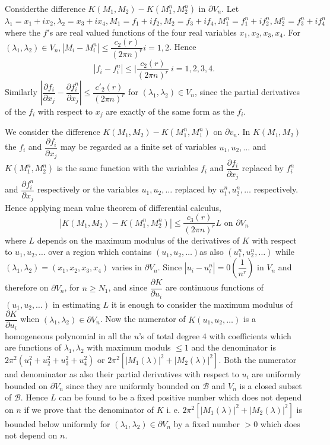 Consider\pageoriginale the difference $K (M_1,  M_2) - K (M^n_1,  M^n_2)$ in
$\partial V_n$. Let $\lambda_1 = x_1 + ix_2,  \lambda_2 = x_3 + ix_4,
M_1 = f_1 + if_2,  M_2 = f_3 + if_4, M^n_1 = f^n_1 + if^n_2, M^n_2 =
f^n_3 + if^n_4$ where the $f'$s are real valued functions of the four
real variables $x_1,  x_2,  x_3,  x_4$. For $(\lambda_1,  \lambda_2)
\in V_n,  | M_i - M^n_i | \leq \dfrac{c_2 (r)}{(2 \pi n)^r} i = 1,
2$. Hence 
$$
|f_i - f^n_i | \leq | \frac{c_2 (r)}{(2 \pi n)^r} ~i = 1, 2, 3, 4.
$$
Similarly $| \dfrac{\partial f_i} {\partial x_j} -   \dfrac{\partial
  f^n_i} {\partial x_j}| \leq \dfrac{c'_2 (r)}{(2 \pi n)^r}$ for
$(\lambda_1,  \lambda_2) \in V_n$, since the partial derivatives of
the $f_i$ with respect to $x_j$ are exactly of the same form as the
$f_i$. 

We consider the difference $K(M_1,  M_2) - K(M^n_1, M^n_1)$ on
$\partial v_n$. In $K(M_1,  M_2)$ the $f_i$ and $\dfrac{\partial
  f_i}{\partial x_j}$ may be regarded as a finite set of variables
$u_1, u_2, \ldots $ and $K(M^n_1, M^n_2)$ is the same function with
the variables $f_i$ and $\dfrac{\partial f_i}{\partial x_j}$ replaced
by $f^n_i$ and $\dfrac{\partial f^n_i}{\partial x_j}$ respectively or
the variables $u_1,  u_2, \ldots$ replaced by $u^n_1,  u^n_2, \ldots$
respectively. Hence applying mean value theorem of differential
calculus, 
\begin{equation}
  | K(M_1,  M_2) - K(M^n_1,  M^n_2)| \leq \frac{c_3(r)}{(2 \pi n)^r} L
  \text{ on } \partial V_n \tag{ii}\label{part2:chap3:sec8:eqii} 
\end{equation}
where $L$ depends on the maximum modulus of the derivatives of $K$
with respect to $u_1, u_2, \ldots$ over a region which contains $(u_1,
u_2, \ldots)$\pageoriginale as also $(u^n_1, u^n_2, \ldots)$ while $(\lambda_1,
\lambda_2) = (x_1, x_2, x_3, x_4)$ varies in $\partial V_n$. Since
$|u_i - u^n_i| = 0 (\dfrac{1}{n^r})$ in $V_n$ and therefore on
$\partial V_n$, for $n \geq N_1$, and since $\dfrac{\partial
  K}{\partial u_i}$ are continuous functions of $(u_1, u_2, \ldots)$
in estimating $L$ it is enough to consider the maximum modulus of
$\dfrac{\partial K}{\partial u_i}$ when $(\lambda_1,  \lambda_2) \in
\partial V_n$. Now the numerator of $K(u_1, u_2, \ldots)$ is a
homogeneous polynomial in all the $u$'s of total degree $4$ with
coefficients which are functions of $\lambda_1,  \lambda_2$ with
maximum moduls $\leq 1$ and the denominator is $2 \pi^2 (u^2_1 + u^2_2
+ u^2_3 + u^2_4)$ or $2 \pi^2 [|M_1(\lambda)|^2 +
  |M_2(\lambda)|^2]$. Both the numerator and denominator as also their
partial derivatives with respect to $u_i$ are uniformly bounded on
$\partial V_n$ since they are uniformly bounded on $\mathscr{B}$ and
$V_n$ is a closed subset of $\mathscr{B}$. Hence $L$ can be found to
be a fixed positive number which does not depend on $n$ if we prove
that the denominator of $K$ i. e. $2 \pi^2 [|M_1(\lambda)|^2 +
  |M_2(\lambda ) |^2]$ is bounded below uniformly for $(\lambda_1,
\lambda_2) \in \partial V_n$ by a fixed number $ > 0$ which does not
depend on $n$. 

